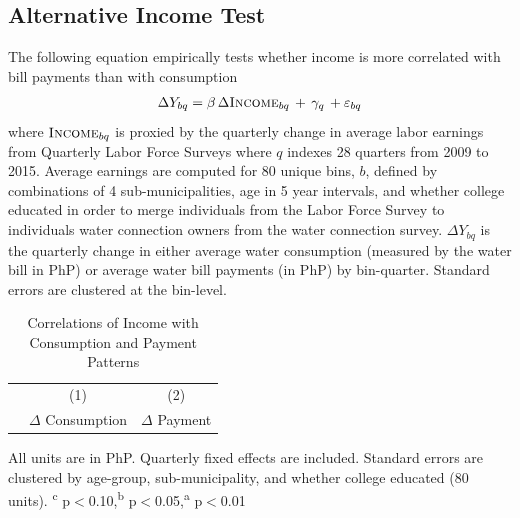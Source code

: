 \documentclass[12pt,table]{article}
\begin{document}
\subsection{Alternative Income Test}\label{appendix:alternativeincome}

The following equation empirically tests whether income is more correlated with bill payments than with consumption
\begin{align*}
\Delta Y_{bq} = \beta\, \Delta \textsc{Income}_{bq} \,+\, \gamma_q \,+\varepsilon_{bq}
\end{align*}
where $\textsc{Income}_{bq}$ is proxied by the quarterly change in average labor earnings from Quarterly Labor Force Surveys where $q$ indexes 28 quarters from 2009 to 2015.  Average earnings are computed for 80 unique bins, $b$, defined by combinations of 4 sub-municipalities, age in 5 year intervals, and whether college educated in order to merge individuals from the Labor Force Survey to individuals water connection owners from the water connection survey.  $\Delta Y_{bq}$ is the quarterly change in either average water consumption (measured by the water bill in PhP) or average water bill payments (in PhP) by bin-quarter.  Standard errors are clustered at the bin-level.

\begin{table}[!ht]
\small
\centering
\begin{threeparttable}
\caption{Correlations of Income with Consumption and Payment Patterns}\label{table:lfsanalysis}
\vspace{-2mm}
\begin{tabular}{lcc}
\toprule
 & \small (1) & \small (2)  \\
 & \small $\Delta$ Consumption & \small $\Delta$ Payment \\[.5em]
 \toprule

\bottomrule
\end{tabular}
\begin{tablenotes}
\footnotesize
\item All units are in PhP.  Quarterly fixed effects are included.  Standard errors are clustered by age-group, sub-municipality, and whether college educated (80 units).  \textsuperscript{c} p$<$0.10,\textsuperscript{b} p$<$0.05,\textsuperscript{a} p$<$0.01 
\end{tablenotes}
\end{threeparttable}
\end{table}
\end{document}
